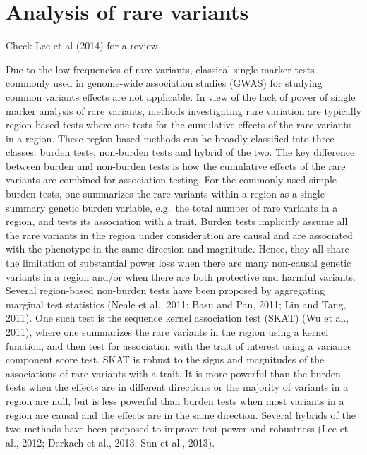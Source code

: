 \documentclass[
]{book}
\begin{document}
\hypertarget{analysis-of-rare-variants}{%
\section{Analysis of rare variants}\label{analysis-of-rare-variants}}

Check Lee et al (2014) for a review

Due to the low frequencies of rare variants, classical single marker tests commonly used in genome-wide association studies (GWAS) for studying common variants effects are not applicable.
In view of the lack of power of single marker analysis of rare variants, methods investigating rare variation are typically region-based tests where one tests for the cumulative effects of the rare variants in a region. These region-based methods can be broadly classified into three classes: burden tests, non-burden tests and hybrid of the two. The key difference between burden and non-burden tests is how the cumulative effects of the rare variants are combined for association testing. For the commonly used simple burden tests, one summarizes the rare variants within a region as a single summary genetic burden variable, e.g.~the total number of rare variants in a region, and tests its association with a trait. Burden tests implicitly assume all the rare variants in the region under consideration are causal and are associated with the phenotype in the same direction and magnitude. Hence, they all share the limitation of substantial power loss when there are many non-causal genetic variants in a region and/or when there are both protective and harmful variants.
Several region-based non-burden tests have been proposed by aggregating marginal test statistics (Neale et al., 2011; Basu and Pan, 2011; Lin and Tang, 2011). One such test is the sequence kernel association test (SKAT) (Wu et al., 2011), where one summarizes the rare variants in the region using a kernel function, and then test for association with the trait of interest using a variance component score test. SKAT is robust to the signs and magnitudes of the associations of rare variants with a trait. It is more powerful than the burden tests when the effects are in different directions or the majority of variants in a region are null, but is less powerful than burden tests when most variants in a region are causal and the effects are in the same direction. Several hybrids of the two methods have been proposed to improve test power and robustness (Lee et al., 2012; Derkach et al., 2013; Sun et al., 2013).
\end{document}
